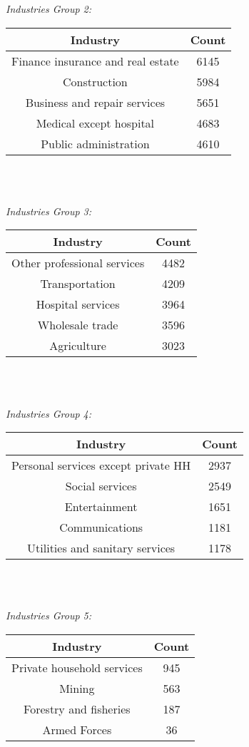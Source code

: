 \documentclass[9pt, twocolumn]{article}
\begin{document}
\par \textit{Industries Group 2:}
\par \begin{tabular}{|c| c| }
					\hline
  					Industry & Count\\ \hline
					Finance insurance and real estate & 6145 \\
					Construction & 5984 \\ 
					Business and repair services & 5651 \\ 
					Medical except hospital & 4683 \\ 
					Public administration & 4610 \\ \hline
				\end{tabular}\\ \\


\par \textit{Industries Group 3:}
\par \begin{tabular}{|c| c| }
					\hline
  					Industry & Count\\ \hline
					Other professional services & 4482 \\
					Transportation & 4209 \\ 
					Hospital services & 3964 \\ 
					Wholesale trade & 3596 \\ 
					Agriculture & 3023 \\ \hline
				\end{tabular}\\ \\


\par \textit{Industries Group 4:}
\par \begin{tabular}{|c| c| }
					\hline
  					Industry & Count\\ \hline
					Personal services except private HH & 2937 \\
					Social services & 2549 \\ 
					Entertainment & 1651 \\ 
					Communications & 1181 \\ 
					Utilities and sanitary services & 1178 \\ \hline
				\end{tabular}\\ \\

\par \textit{Industries Group 5:}
\par \begin{tabular}{|c| c| }
					\hline
  					Industry & Count\\ \hline
					Private household services & 945 \\
					Mining & 563 \\ 
					Forestry and fisheries & 187 \\ 
					Armed Forces & 36 \\ \hline
				\end{tabular}\\ \\
\end{document}
